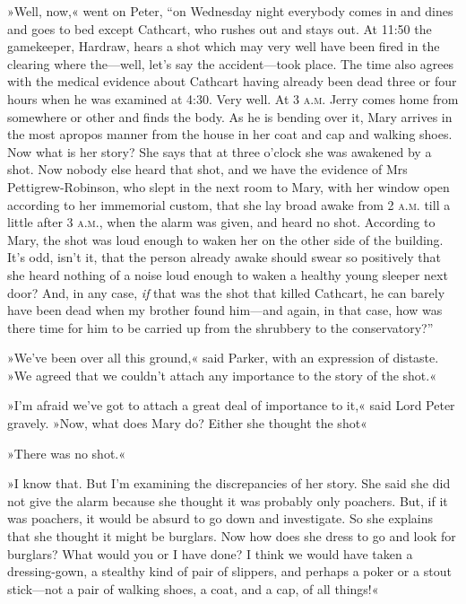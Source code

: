 »Well, now,« went on Peter, \enquote{on Wednesday night everybody comes in and dines and goes to bed except Cathcart, who rushes out and stays out. At 11:50 the gamekeeper, Hardraw, hears a shot which may very well have been fired in the clearing where the\allowbreak---\allowbreak well, let's say the accident\allowbreak---\allowbreak took place. The time also agrees with the medical evidence about Cathcart having already been dead three or four hours when he was examined at 4:30. Very well. At 3 \textsc{a.m.} Jerry comes home from somewhere or other and finds the body. As he is bending over it, Mary arrives in the most apropos manner from the house in her coat and cap and walking shoes. Now what is her story? She says that at three o'clock she was awakened by a shot. Now nobody else heard that shot, and we have the evidence of Mrs Pettigrew-Robinson, who slept in the next room to Mary, with her window open according to her immemorial custom, that she lay broad awake from 2 \textsc{a.m.} till a little after 3 \textsc{a.m.}, when the alarm was given, and heard no shot. According to Mary, the shot was loud enough to waken her on the other side of the building. It's odd, isn't it, that the person already awake should swear so positively that she heard nothing of a noise loud enough to waken a healthy young sleeper next door? And, in any case, \textit{if} that was the shot that killed Cathcart, he can barely have been dead when my brother found him\allowbreak---\allowbreak and again, in that case, how was there time for him to be carried up from the shrubbery to the conservatory?}

»We've been over all this ground,« said Parker, with an expression of distaste. »We agreed that we couldn't attach any importance to the story of the shot.«

»I'm afraid we've got to attach a great deal of importance to it,« said Lord Peter gravely. »Now, what does Mary do? Either she thought the shot\longdash«

»There was no shot.«

»I know that. But I'm examining the discrepancies of her story. She said she did not give the alarm because she thought it was probably only poachers. But, if it was poachers, it would be absurd to go down and investigate. So she explains that she thought it might be burglars.  Now how does she dress to go and look for burglars? What would you or I have done? I think we would have taken a dressing-gown, a stealthy kind of pair of slippers, and perhaps a poker or a stout stick\allowbreak---\allowbreak not a pair of walking shoes, a coat, and a cap, of all things!«

